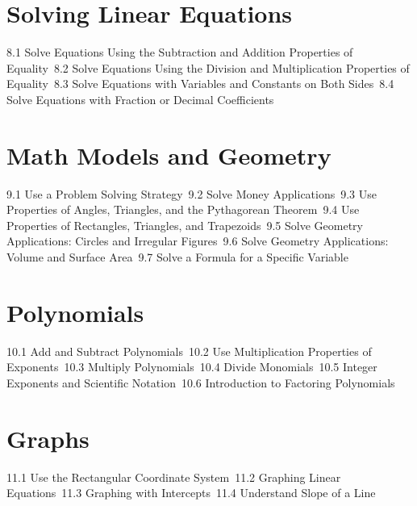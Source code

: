 \section{Solving Linear Equations}
8.1 Solve Equations Using the Subtraction and Addition Properties of Equality\
8.2 Solve Equations Using the Division and Multiplication Properties of Equality\
8.3 Solve Equations with Variables and Constants on Both Sides\
8.4 Solve Equations with Fraction or Decimal Coefficients\
\section{Math Models and Geometry}
9.1 Use a Problem Solving Strategy\
9.2 Solve Money Applications\
9.3 Use Properties of Angles, Triangles, and the Pythagorean Theorem\
9.4 Use Properties of Rectangles, Triangles, and Trapezoids\
9.5 Solve Geometry Applications: Circles and Irregular Figures\
9.6 Solve Geometry Applications: Volume and Surface Area\
9.7 Solve a Formula for a Specific Variable\
\section{Polynomials}
10.1 Add and Subtract Polynomials\
10.2 Use Multiplication Properties of Exponents\
10.3 Multiply Polynomials\
10.4 Divide Monomials\
10.5 Integer Exponents and Scientific Notation\
10.6 Introduction to Factoring Polynomials\
\section{Graphs}
11.1 Use the Rectangular Coordinate System\
11.2 Graphing Linear Equations\
11.3 Graphing with Intercepts\
11.4 Understand Slope of a Line\
